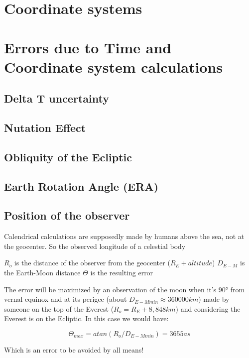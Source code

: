 \documentclass[%
a4paper,%
pagesize,%
12pt,%
parskip=off,%
bibliography=totoc,%
numbers=noenddot,%
DIV=12,%
twoside=semi,%
headings=small,%
]{scrartcl}
\begin{document}
\section{Coordinate systems}

\section{Errors due to Time and Coordinate system calculations}

\subsection{Delta T uncertainty}

\subsection{Nutation Effect}

\subsection{Obliquity of the Ecliptic}

\subsection{Earth Rotation Angle (ERA)}

\subsection{Position of the observer}

Calendrical calculations are supposedly made by humans above the sea, not at the geocenter. So the observed longitude of a celestial body 

$R_o$ is the distance of the observer from the geocenter ($R_E+altitude$)
$D_{E-M}$ is the Earth-Moon distance
$\Theta$ is the resulting error

The error will be maximized by an observation of the moon when it's $90°$ from vernal equinox and at its perigee (about $D_{E-Mmin}\approx360000km$) made by someone on the top of the Everest ($R_o=R_E+8,848km$) and considering the Everest is on the Ecliptic. In this case we would have:

$$\Theta_{max} = atan(R_o/D_{E-Mmin}) = 3655as$$


Which is an error to be avoided by all means!
\end{document}
